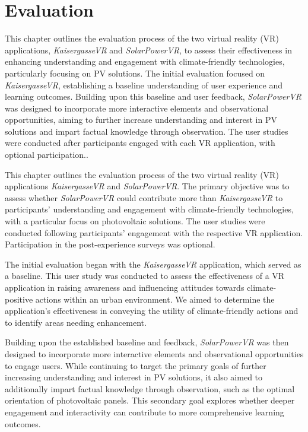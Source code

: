 \documentclass[draft, final]{vutinfth} %
\begin{document}
\chapter{Evaluation}

This chapter outlines the evaluation process of the two virtual reality (VR) applications, \textit{KaisergasseVR} and \textit{SolarPowerVR}, to assess their effectiveness in enhancing understanding and engagement with climate-friendly technologies, particularly focusing on PV solutions. The initial evaluation focused on \textit{KaisergasseVR}, establishing a baseline understanding of user experience and learning outcomes. Building upon this baseline and user feedback, \textit{SolarPowerVR} was designed to incorporate more interactive elements and observational opportunities, aiming to further increase understanding and interest in PV solutions and impart factual knowledge through observation. The user studies were conducted after participants engaged with each VR application, with optional participation.. 

This chapter outlines the evaluation process of the two virtual reality (VR) applications \textit{KaisergasseVR} and \textit{SolarPowerVR}. The primary objective was to assess whether \textit{SolarPowerVR} could contribute more than \textit{KaisergasseVR} to participants' understanding and engagement with climate-friendly technologies, with a particular focus on photovoltaic solutions. The user studies were conducted following participants' engagement with the respective VR application. Participation in the post-experience surveys was optional.

The initial evaluation began with the \textit{KaisergasseVR} application, which served as a baseline. This user study was conducted to assess the effectiveness of a VR application in raising awareness and influencing attitudes towards climate-positive actions within an urban environment. We aimed to determine the application's effectiveness in conveying the utility of climate-friendly actions and to identify areas needing enhancement.

Building upon the established baseline and feedback, \textit{SolarPowerVR} was then designed to incorporate more interactive elements and observational opportunities to engage users. While continuing to target the primary goals of further increasing understanding and interest in PV solutions, it also aimed to additionally impart factual knowledge through observation, such as the optimal orientation of photovoltaic panels. This secondary goal explores whether deeper engagement and interactivity can contribute to more comprehensive learning outcomes.
\end{document}
